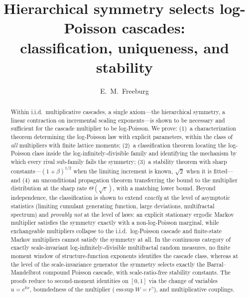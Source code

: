 \documentclass[12pt]{amsart}
\theoremstyle{definition}
\theoremstyle{remark}
\DeclareMathOperator*{\esssup}{ess\,sup}
\begin{document}
\title[Hierarchical symmetry selects log-Poisson cascades]%
{Hierarchical symmetry selects log-Poisson cascades: \\
classification, uniqueness, and stability}

\author{E.~M.~Freeburg}
\address{Independent Researcher}
\date{}

\begin{abstract}
Within i.i.d.\ multiplicative cascades, a single axiom---the
hierarchical symmetry, a linear contraction on incremental scaling
exponents---is shown to be necessary and sufficient for the cascade
multiplier to be log-Poisson.  We prove: (1)~a characterization
theorem determining the log-Poisson law with explicit parameters,
within the class of \emph{all} multipliers with finite lattice
moments; (2)~a classification theorem locating the log-Poisson class
inside the log-infinitely-divisible family and identifying the
mechanism by which every rival sub-family fails the symmetry; (3)~a
stability theorem with sharp constants---$(1+\beta)^{1/2}$ when the
limiting increment is known, $\sqrt2$ when it is fitted---and (4)~an
unconditional propagation theorem transferring the bound to the
multiplier distribution at the sharp rate $\Theta(\sqrt\varepsilon)$,
with a matching lower bound.  Beyond independence, the classification
is shown to extend \emph{exactly} at the level of asymptotic
statistics (limiting cumulant generating function, large deviations,
multifractal spectrum) and \emph{provably not} at the level of laws:
an explicit stationary ergodic Markov multiplier satisfies the
symmetry exactly with a non-log-Poisson marginal, while exchangeable
multipliers collapse to the i.i.d.\ log-Poisson cascade and
finite-state Markov multipliers cannot satisfy the symmetry at all.
In the continuous category of exactly scale-invariant
log-infinitely-divisible multifractal random measures, no finite
moment window of structure-function exponents identifies the cascade
class, whereas at the level of the scale-invariance generator the
symmetry selects exactly the Barral--Mandelbrot compound Poisson
cascade, with scale-ratio-free stability constants.  The proofs
reduce to second-moment identities on $[0,1]$ via the change of
variables $u = e^{kx}$, boundedness of the multiplier
($\esssup W = r^\gamma$), and multiplicative couplings.
\end{abstract}

\maketitle
\end{document}
